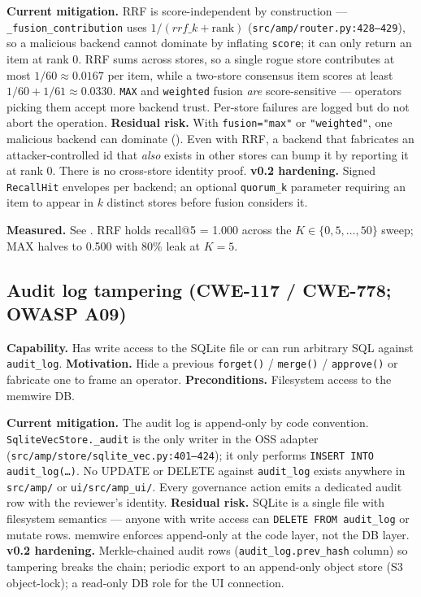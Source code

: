 \documentclass[11pt,letterpaper,twocolumn]{article}
\begin{document}
\textbf{Current mitigation.} RRF is score-independent by construction --- \texttt{\_fusion\_contribution} uses $1 / (\mathit{rrf\_k} + \mathrm{rank})$ (\texttt{src/amp/router.py:428--429}), so a malicious backend cannot dominate by inflating \texttt{score}; it can only return an item at rank 0. RRF sums across stores, so a single rogue store contributes at most $1/60 \approx 0.0167$ per item, while a two-store consensus item scores at least $1/60 + 1/61 \approx 0.0330$. \texttt{MAX} and \texttt{weighted} fusion \emph{are} score-sensitive --- operators picking them accept more backend trust. Per-store failures are logged but do not abort the operation. \textbf{Residual risk.} With \texttt{fusion="max"} or \texttt{"weighted"}, one malicious backend can dominate (). Even with RRF, a backend that fabricates an attacker-controlled id that \emph{also} exists in other stores can bump it by reporting it at rank 0. There is no cross-store identity proof. \textbf{v0.2 hardening.} Signed \texttt{RecallHit} envelopes per backend; an optional \texttt{quorum\_k} parameter requiring an item to appear in $k$ distinct stores before fusion considers it.

\textbf{Measured.} See . RRF holds recall@5 = 1.000 across the $K \in \{0,5,\dots,50\}$ sweep; MAX halves to 0.500 with 80\% leak at $K=5$.

\subsection{Audit log tampering (CWE-117 / CWE-778; OWASP A09)}
\label{sec:threats-audit}

\textbf{Capability.} Has write access to the SQLite file or can run arbitrary SQL against \texttt{audit\_log}. \textbf{Motivation.} Hide a previous \texttt{forget()} / \texttt{merge()} / \texttt{approve()} or fabricate one to frame an operator. \textbf{Preconditions.} Filesystem access to the memwire DB.

\textbf{Current mitigation.} The audit log is append-only by code convention. \texttt{SqliteVecStore.\_audit} is the only writer in the OSS adapter (\texttt{src/amp/store/sqlite\_vec.py:401--424}); it only performs \texttt{INSERT INTO audit\_log(\ldots)}. No UPDATE or DELETE against \texttt{audit\_log} exists anywhere in \texttt{src/amp/} or \texttt{ui/src/amp\_ui/}. Every governance action emits a dedicated audit row with the reviewer's identity. \textbf{Residual risk.} SQLite is a single file with filesystem semantics --- anyone with write access can \texttt{DELETE FROM audit\_log} or mutate rows. memwire enforces append-only at the code layer, not the DB layer. \textbf{v0.2 hardening.} Merkle-chained audit rows (\texttt{audit\_log.prev\_hash} column) so tampering breaks the chain; periodic export to an append-only object store (S3 object-lock); a read-only DB role for the UI connection.
\end{document}
